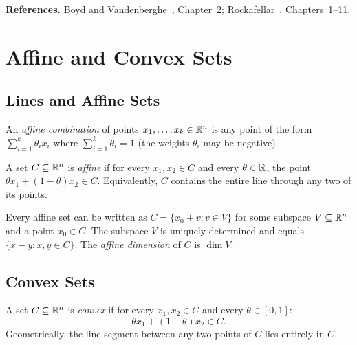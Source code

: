 \documentclass[11pt,a4paper]{article}
\begin{document}
\textbf{References.}  Boyd and Vandenberghe~\cite{boyd2004}, Chapter~2;
Rockafellar~\cite{rockafellar1970}, Chapters~1--11.


\section{Affine and Convex Sets}

\subsection{Lines and Affine Sets}

\begin{definition}
\label{def:affine-combination}
An \emph{affine combination} of points $x_1, \ldots, x_k \in \mathbb{R}^n$ is any
point of the form $\sum_{i=1}^k \theta_i x_i$ where $\sum_{i=1}^k \theta_i =
1$ (the weights $\theta_i$ may be negative).
\end{definition}

\begin{definition}
\label{def:affine-set}
A set $C \subseteq \mathbb{R}^n$ is \emph{affine} if for every $x_1, x_2 \in C$ and
every $\theta \in \mathbb{R}$, the point $\theta x_1 + (1-\theta) x_2 \in C$.
Equivalently, $C$ contains the entire line through any two of its points.
\end{definition}

\begin{remark}
Every affine set can be written as $C = \{x_0 + v : v \in V\}$ for some
subspace $V \subseteq \mathbb{R}^n$ and a point $x_0 \in C$.  The subspace $V$ is
uniquely determined and equals $\{x - y : x, y \in C\}$.  The \emph{affine
dimension} of $C$ is $\dim V$.
\end{remark}

\subsection{Convex Sets}

\begin{definition}
\label{def:convex-set}
A set $C \subseteq \mathbb{R}^n$ is \emph{convex} if for every $x_1, x_2 \in C$ and
every $\theta \in [0,1]$:
\[
  \theta x_1 + (1-\theta) x_2 \in C.
\]
Geometrically, the line segment between any two points of $C$ lies entirely
in $C$.
\end{definition}
\end{document}
